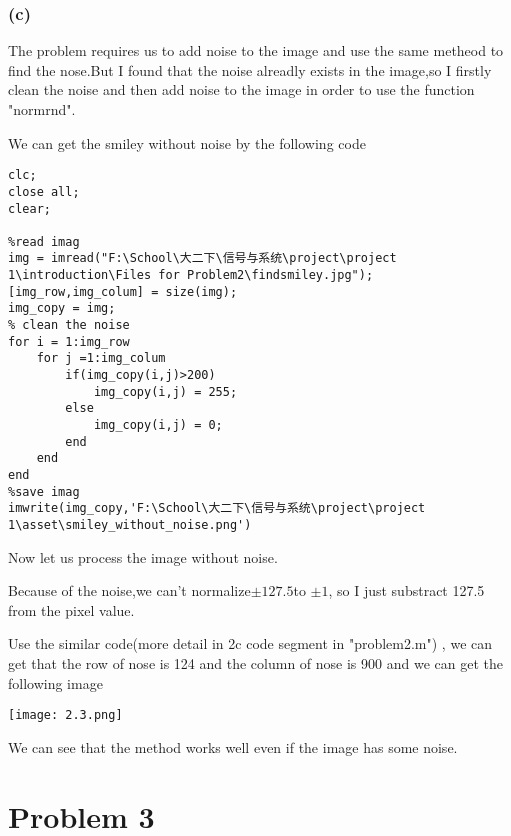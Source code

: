 \documentclass{article}
\begin{document}
\subsubsection*{(c)}
The problem requires us to add noise to the image and 
use the same metheod to find the nose.But I found that 
the noise alreadly exists in the image,so I firstly clean 
the noise and then add noise to the image in order to 
use the function "normrnd".\par
We can get the smiley without noise by the following code
\begin{lstlisting}
clc;
close all;
clear;

%read imag
img = imread("F:\School\大二下\信号与系统\project\project 1\introduction\Files for Problem2\findsmiley.jpg");
[img_row,img_colum] = size(img);
img_copy = img;
% clean the noise
for i = 1:img_row
    for j =1:img_colum
        if(img_copy(i,j)>200)
            img_copy(i,j) = 255;
        else
            img_copy(i,j) = 0;
        end
    end
end
%save imag
imwrite(img_copy,'F:\School\大二下\信号与系统\project\project 1\asset\smiley_without_noise.png')
\end{lstlisting}
Now let us process the image without noise.\par
Because of the noise,we can't normalize$\pm 127.5$to $\pm 1$,
so I just substract 127.5 from the pixel value.\par
Use the similar code(more detail in 2c code segment in "problem2.m") ,
we can get that the row of nose is 124 and
the column of nose is 900 and we can get the following image
\begin{center}
    \texttt{[image: 2.3.png]}
\end{center}
We can see that the method works well even if the image has some noise.
\newpage
\section{Problem 3}
\end{document}
